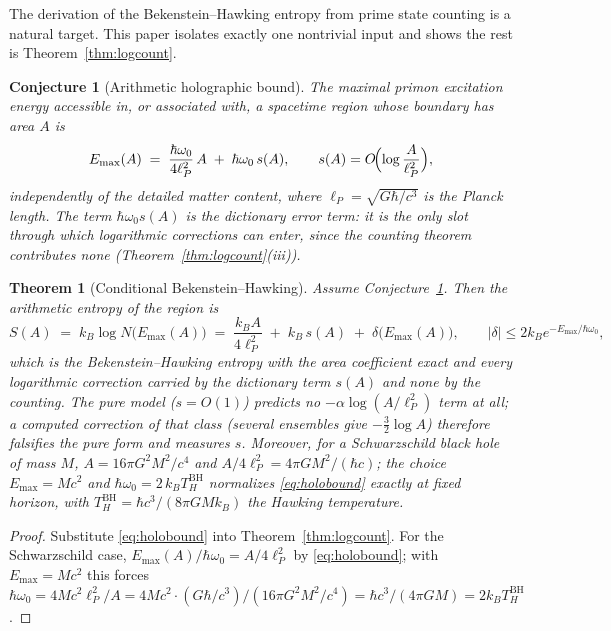 \documentclass[11pt,a4paper]{article}
\theoremstyle{plain}
\newtheorem{theorem}{Theorem}[section]
\newtheorem{conjecture}{Conjecture}[section]
\theoremstyle{definition}
\theoremstyle{remark}
\begin{document}
The derivation of the Bekenstein--Hawking entropy from prime state counting
is a natural target. This paper isolates exactly one
nontrivial input and shows the rest is Theorem~\ref{thm:logcount}.

\begin{conjecture}[Arithmetic holographic bound]\label{conj:holobound}
The maximal primon excitation energy accessible in, or associated with, a spacetime region
whose boundary has area $A$ is
\begin{equation}\label{eq:holobound}
E_{\max}(A)\;=\;\frac{\hbar\omega_{0}}{4\ell_{P}^{2}}\,A\;+\;\hbar\omega_{0}\,s(A),
\qquad
s(A)=O\!\Bigl(\log\frac{A}{\ell_{P}^{2}}\Bigr),
\end{equation}
independently of the detailed matter content, where
$\ell_{P}=\sqrt{G\hbar/c^{3}}$ is the Planck length. The term $\hbar\omega_{0}s(A)$ is the
\emph{dictionary error term}: it is the only slot through which logarithmic corrections can
enter, since the counting theorem contributes none (Theorem~\ref{thm:logcount}(iii)).
\end{conjecture}

\begin{theorem}[Conditional Bekenstein--Hawking]\label{thm:bh}
Assume Conjecture~\ref{conj:holobound}. Then the arithmetic entropy of the region is
\begin{equation}
S(A)\;=\;k_{B}\log N\bigl(E_{\max}(A)\bigr)
\;=\;\frac{k_{B}A}{4\ell_{P}^{2}}\;+\;k_{B}\,s(A)\;+\;\delta\bigl(E_{\max}(A)\bigr),
\qquad
|\delta|\leq2k_{B}e^{-E_{\max}/\hbar\omega_{0}},
\end{equation}
which is the Bekenstein--Hawking entropy \cite{bekenstein1973,hawking1975} with the area
coefficient exact and \emph{every} logarithmic correction carried by the dictionary term
$s(A)$ and none by the counting. The pure model ($s=O(1)$) predicts no
$-\alpha\log(A/\ell_{P}^{2})$ term at all; a computed correction of that class (several
ensembles give $-\tfrac32\log A$) therefore falsifies the pure form and measures $s$.
Moreover, for a Schwarzschild black hole of
mass $M$, $A=16\pi G^{2}M^{2}/c^{4}$ and $A/4\ell_{P}^{2}=4\pi GM^{2}/(\hbar c)$; the choice
$E_{\max}=Mc^{2}$ and $\hbar\omega_{0}=2\,k_{B}T_{H}^{\mathrm{BH}}$ normalizes
\eqref{eq:holobound} \emph{exactly} at fixed horizon, with $T_{H}^{\mathrm{BH}}=\hbar c^{3}/(8\pi GMk_{B})$
the Hawking temperature.
\end{theorem}

\begin{proof}
Substitute \eqref{eq:holobound} into Theorem~\ref{thm:logcount}. For the Schwarzschild case,
$E_{\max}(A)/\hbar\omega_{0}=A/4\ell_{P}^{2}$ by \eqref{eq:holobound}; with
$E_{\max}=Mc^{2}$ this forces $\hbar\omega_{0}=4Mc^{2}\ell_{P}^{2}/A
=4Mc^{2}\cdot(G\hbar/c^{3})/(16\pi G^{2}M^{2}/c^{4})
=\hbar c^{3}/(4\pi GM)=2k_{B}T_{H}^{\mathrm{BH}}$.
\end{proof}
\end{document}
